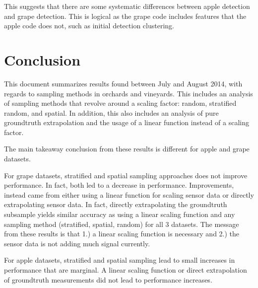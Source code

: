 This suggests that there are some systematic differences between apple detection and grape detection. This is logical as the grape code includes features that the apple code does not, such as initial detection clustering.

\section{ Conclusion }
This document summarizes results found between July and August 2014, with regards to sampling methods in orchards and vineyards. This includes an analysis of sampling methods that revolve around a scaling factor: random, stratified random, and spatial. In addition, this also includes an analysis of pure groundtruth extrapolation and the usage of a linear function instead of a scaling factor.

The main takeaway conclusion from these results is different for apple and grape datasets.

For grape datasets, stratified and spatial sampling approaches does not improve performance. In fact, both led to a decrease in performance. Improvements, instead came from either using a linear function for scaling sensor data or directly extrapolating sensor data. In fact, directly extrapolating the groundtruth subsample yields similar accuracy as using a linear scaling function and any sampling method (stratified, spatial, random) for all 3 datasets. The message from these results is that 1.) a linear scaling function is necessary and 2.) the sensor data is not adding much signal currently.

For apple datasets, stratified and spatial sampling lead to small increases in performance that are marginal. A linear scaling function or direct extrapolation of groundtruth measurements did not lead to performance increases.

